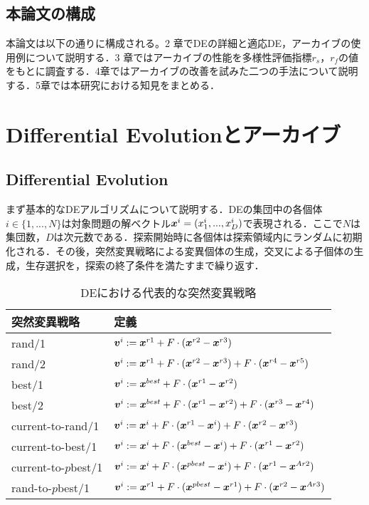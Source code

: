 \documentclass[a4paper,11pt,oneside,openany]{jsbook}
\def\vector#1{\mbox{\boldmath $#1$}}
\begin{document}
\section{本論文の構成}
本論文は以下の通りに構成される。2 章でDEの詳細と適応DE，アーカイブの使用例について説明する．3 章ではアーカイブの性能を多様性評価指標$r_s$，$r_f$の値をもとに調査する．4章ではアーカイブの改善を試みた二つの手法について説明する．5章では本研究における知見をまとめる．

\chapter{Differential Evolutionとアーカイブ}
\section{Differential Evolution}
まず基本的なDEアルゴリズムについて説明する．DEの集団中の各個体$i \in \{1, ..., N\}$は対象問題の解ベクトル$\vector{x}^i = (x^i_1, ..., x^i_D)$で表現される．ここで$N$は集団数，$D$は次元数である．探索開始時に各個体は探索領域内にランダムに初期化される．その後，突然変異戦略による変異個体の生成，交叉による子個体の生成，生存選択を，探索の終了条件を満たすまで繰り返す．

\begin{table}[h]
  \begin{center}
  \caption{DEにおける代表的な突然変異戦略}
    \begin{tabular}{ll} \hline
      突然変異戦略　& 定義  \\ \hline
      rand/1 & $\vector{v}^{i} := \vector{x}^{r1} + F\cdot(\vector{x}^{r2} - \vector{x}^{r3})$ \\
      rand/2 & $\vector{v}^{i} := \vector{x}^{r1} + F\cdot(\vector{x}^{r2} - \vector{x}^{r3}) + F\cdot(\vector{x}^{r4} - \vector{x}^{r5})$ \\
      best/1 & $\vector{v}^{i} := \vector{x}^{best} + F\cdot(\vector{x}^{r1} - \vector{x}^{r2})$ \\
      best/2 & $\vector{v}^{i} := \vector{x}^{best} + F\cdot(\vector{x}^{r1} - \vector{x}^{r2}) + F\cdot(\vector{x}^{r3} - \vector{x}^{r4})$ \\
      current-to-rand/1 & $\vector{v}^{i} := \vector{x}^{i} + F\cdot(\vector{x}^{r1} - \vector{x}^{i}) + F\cdot(\vector{x}^{r2} - \vector{x}^{r3})$ \\
      current-to-best/1 & $\vector{v}^{i} := \vector{x}^{i} + F\cdot(\vector{x}^{best} - \vector{x}^{i}) + F\cdot(\vector{x}^{r1} - \vector{x}^{r2})$ \\
      current-to-$p$best/1 & $\vector{v}^{i} := \vector{x}^{i} + F\cdot(\vector{x}^{pbest} - \vector{x}^{i}) + F\cdot(\vector{x}^{r1} - \vector{x}^{Ar2})$ \\
      rand-to-$p$best/1 & $\vector{v}^{i} := \vector{x}^{r1} + F\cdot(\vector{x}^{pbest} - \vector{x}^{r1}) + F\cdot(\vector{x}^{r2} - \vector{x}^{Ar3})$ \\ \hline
    \end{tabular}
  \end{center}
\end{table}
\end{document}
